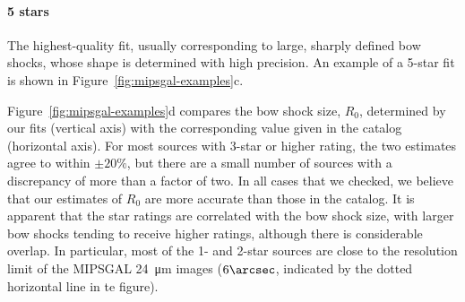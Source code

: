 \paragraph*{5 stars} The highest-quality fit, usually corresponding to
large, sharply defined bow shocks, whose shape is determined with high
precision. An example of a 5-star fit is shown in
Figure~\ref{fig:mipsgal-examples}c.
\bigskip

% 
Figure~\ref{fig:mipsgal-examples}d compares the bow shock size,
\(R_0\), determined by our fits (vertical axis) with the corresponding
value given in the \citet{Kobulnicky:2016a} catalog (horizontal axis).
For most sources with 3-star or higher rating, the two estimates agree
to within \(\pm 20\%\), but there are a small number of sources with a
discrepancy of more than a factor of two.  In all cases that we
checked, we believe that our estimates of \(R_0\) are more accurate
than those in the catalog.  It is apparent that the star ratings are
correlated with the bow shock size, with larger bow shocks tending to
receive higher ratings, although there is considerable overlap.  In
particular, most of the 1- and 2-star sources are close to the
resolution limit of the MIPSGAL \SI{24}{\um} images (\(6\arcsec\),
indicated by the dotted horizontal line in te figure).

